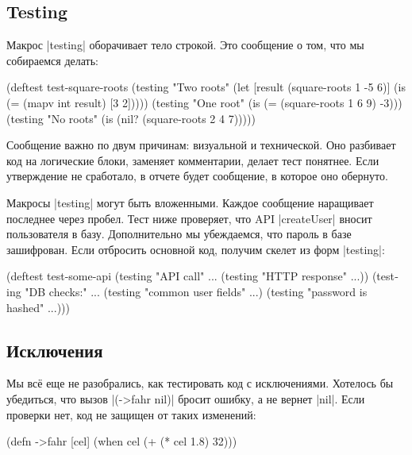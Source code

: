 \subsection{Testing}

Макрос \spverb|testing| оборачивает тело строкой. Это сообщение о том, что мы
собираемся делать:

\begin{english}
  \begin{clojure}
(deftest test-square-roots
  (testing "Two roots"
    (let [result (square-roots 1 -5 6)]
      (is (= (mapv int result) [3 2]))))
  (testing "One root"
    (is (= (square-roots 1 6 9) -3)))
  (testing "No roots"
    (is (nil? (square-roots 2 4 7)))))
  \end{clojure}
\end{english}

Сообщение важно по двум причинам: визуальной и технической. Оно разбивает код на
логические блоки, заменяет комментарии, делает тест понятнее. Если утверждение
не сработало, в отчете будет сообщение, в которое оно обернуто.

Макросы \spverb|testing| могут быть вложенными. Каждое сообщение наращивает
последнее через пробел. Тест ниже проверяет, что API \spverb|createUser| вносит
пользователя в базу. Дополнительно мы убеждаемся, что пароль в базе
зашифрован. Если отбросить основной код, получим скелет из форм
\spverb|testing|:

\begin{english}
  \begin{clojure}
(deftest test-some-api
  (testing "API call" ...
    (testing "HTTP response" ...))
  (testing "DB checks:" ...
    (testing "common user fields" ...)
    (testing "password is hashed" ...)))
  \end{clojure}
\end{english}

\subsection{Исключения}

Мы вс\"{е} еще не разобрались, как тестировать код с исключениями. Хотелось бы
убедиться, что вызов \spverb|(->fahr nil)| бросит ошибку, а не вернет
\spverb|nil|. Если проверки нет, код не защищен от таких изменений:

\begin{english}
  \begin{clojure}
(defn ->fahr [cel]
  (when cel
    (+ (* cel 1.8) 32)))
  \end{clojure}
\end{english}

